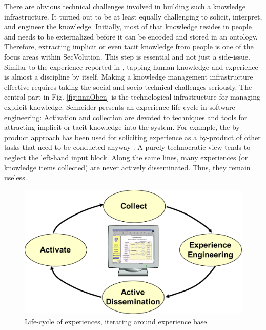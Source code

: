 There are obvious technical challenges involved in building such a knowledge infrastructure. It turned out to be at least equally challenging to solicit, interpret, and engineer the knowledge. Initially, most of that knowledge resides in people and needs to be externalized \cite{Nonaka1995} before it can be encoded and stored in an ontology. Therefore, extracting implicit or even tacit knowledge from people is one of the focus areas within SecVolution. This step is essential and not just a side-issue. Similar to the experience reported in \cite{Schneider2009}, tapping human knowledge and experience is almost a discipline by itself. Making a knowledge management infrastructure effective requires taking the social and socio-technical challenges seriously. The central part in Fig. \ref{fig:nnnOben} is the technological infrastructure for managing explicit knowledge. Schneider presents an experience life cycle\cite{Schneider2009} in software engineering: Activation and collection are  devoted to techniques and tools for attracting implicit or tacit knowledge into the system. For example, the by-product approach has been used for soliciting experience as a by-product of other tasks that need to be conducted anyway \cite{Schneider2006}. A purely technocratic view \cite{Earl2001} tends to neglect the left-hand input block. Along the same lines, many experiences (or knowledge items collected) are never actively disseminated. Thus, they remain useless.



\begin{figure}
        \centering
    \includegraphics[width=0.7\columnwidth]{figs/nnnUnten}
    \caption{Life-cycle of experiences, iterating around experience base.}
    \label{fig:nnnUnten}
\end{figure}


